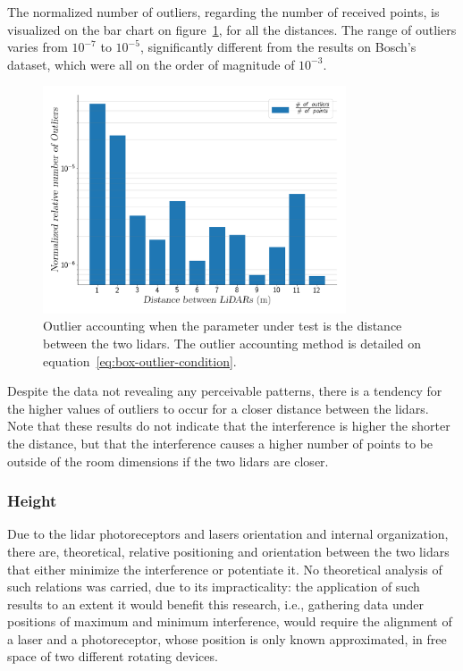 The normalized number of outliers, regarding the number of received points, is visualized on the bar chart on figure~\ref{fig:box-filter-outliers-distance}, for all the distances. The range of outliers varies from $10^{-7}$ to $10^{-5}$, significantly different from the results on Bosch's dataset, which were all on the order of magnitude of $10^{-3}$.

\begin{figure}[!ht]
\centering
\includegraphics[width=0.8\textwidth]{img/lidar-interference/box-filtering/interference-box-filter-outliers-distance.png}
\caption{Outlier accounting when the parameter under test is the distance between the two \acp{lidar}. The outlier accounting method is detailed on equation~\ref{eq:box-outlier-condition}.}
\label{fig:box-filter-outliers-distance}
\end{figure}

Despite the data not revealing any perceivable patterns, there is a tendency for the higher values of outliers to occur for a closer distance between the \acp{lidar}. Note that these results do not indicate that the interference is higher the shorter the distance, but that the interference causes a higher number of points to be outside of the room dimensions if the two \acp{lidar} are closer. 

\subsubsection{Height}
Due to the \ac{lidar} photoreceptors and lasers orientation and internal organization, there are, theoretical, relative positioning and orientation between the two \acp{lidar} that either minimize the interference or potentiate it. No theoretical analysis of such relations was carried, due to its impracticality: the application of such results to an extent it would benefit this research, i.e., gathering data under positions of maximum and minimum interference,  would require the alignment of a laser and a photoreceptor, whose position is only known approximated, in free space of two different rotating devices.

